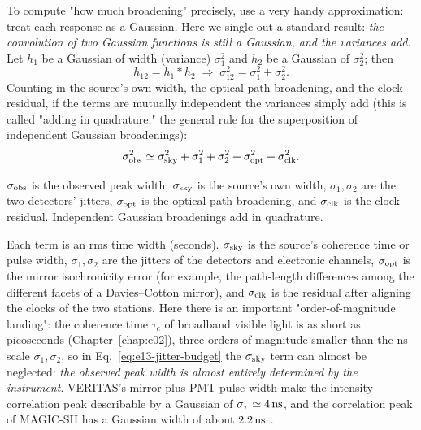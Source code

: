 To compute "how much broadening" precisely, use a very handy approximation: treat each response as a Gaussian. Here we single out a standard result: \emph{the convolution of two Gaussian functions is still a Gaussian, and the variances add}. Let $h_1$ be a Gaussian of width (variance) $\sigma_1^2$ and $h_2$ be a Gaussian of $\sigma_2^2$; then
\[
  h_{12}=h_1*h_2 \;\Longrightarrow\; \sigma_{12}^2=\sigma_1^2+\sigma_2^2 .
\]
Counting in the source's own width, the optical-path broadening, and the clock residual, if the terms are mutually independent the variances simply add (this is called "adding in quadrature," the general rule for the superposition of independent Gaussian broadenings):
\begin{equation}
  \sigma_{\rm obs}^2
  \simeq
  \sigma_{\rm sky}^2+\sigma_1^2+\sigma_2^2+\sigma_{\rm opt}^2+\sigma_{\rm clk}^2 .
  \label{eq:e13-jitter-budget}
\end{equation}
\begin{formulaexplain}
$\sigma_{\rm obs}$ is the observed peak width; $\sigma_{\rm sky}$ is the source's own width, $\sigma_1,\sigma_2$ are the two detectors' jitters, $\sigma_{\rm opt}$ is the optical-path broadening, and $\sigma_{\rm clk}$ is the clock residual. Independent Gaussian broadenings add in quadrature.
\end{formulaexplain}
Each term is an rms time width (seconds). $\sigma_{\rm sky}$ is the source's coherence time or pulse width, $\sigma_1,\sigma_2$ are the jitters of the detectors and electronic channels, $\sigma_{\rm opt}$ is the mirror isochronicity error (for example, the path-length differences among the different facets of a Davies--Cotton mirror), and $\sigma_{\rm clk}$ is the residual after aligning the clocks of the two stations. Here there is an important "order-of-magnitude landing": the coherence time $\tau_c$ of broadband visible light is as short as picoseconds (Chapter~\ref{chap:e02}), three orders of magnitude smaller than the ns-scale $\sigma_1,\sigma_2$, so in Eq.~\eqref{eq:e13-jitter-budget} the $\sigma_{\rm sky}$ term can almost be neglected: \emph{the observed peak width is almost entirely determined by the instrument}. VERITAS's mirror plus PMT pulse width make the intensity correlation peak describable by a Gaussian of $\sigma_\tau\simeq4\,{\rm ns}$, and the correlation peak of MAGIC-SII has a Gaussian width of about $2.2\,{\rm ns}$ \citep{2020NatAs...4.1164A,2024MNRAS.529.4387A}.

